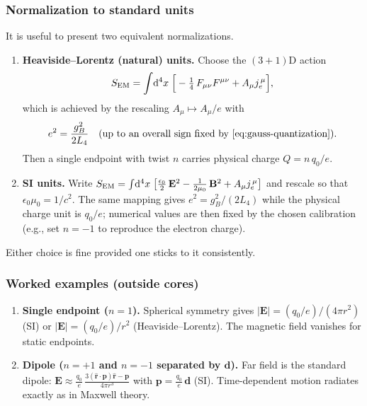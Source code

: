 \subsubsection{Normalization to standard units}
It is useful to present two equivalent normalizations.
\begin{enumerate}
  \item \textbf{Heaviside--Lorentz (natural) units.} Choose the $(3{+}1)$D action
  \begin{equation}
  S_{\rm EM}=\int\!\mathrm d^4x\;\Big[-\tfrac{1}{4}\,F_{\mu\nu}F^{\mu\nu}+A_\mu j_e^{\,\mu}\Big],
  \end{equation}
  which is achieved by the rescaling $A_\mu\mapsto A_\mu/e$ with
  \begin{equation}
  e^{2}=\frac{g_B^{2}}{2L_4} \quad (\text{up to an overall sign fixed by \eqref{eq:gauss-quantization}}).
  \end{equation}
  Then a single endpoint with twist $n$ carries physical charge $Q= n\,q_0/e$.

  \item \textbf{SI units.} Write $S_{\rm EM}=\int\!\mathrm d^4x\;\big[\tfrac{\epsilon_0}{2}\,\mathbf E^2-\tfrac{1}{2\mu_0}\,\mathbf B^2 + A_\mu j_e^{\,\mu}\big]$ and rescale so that $\epsilon_0\mu_0=1/c^2$. The same mapping gives $e^2= g_B^{2}/(2L_4)$ while the physical charge unit is $q_0/e$; numerical values are then fixed by the chosen calibration (e.g., set $n=-1$ to reproduce the electron charge).
\end{enumerate}
Either choice is fine provided one sticks to it consistently.

\subsubsection{Worked examples (outside cores)}
\begin{enumerate}
  \item \textbf{Single endpoint ($n=1$).} Spherical symmetry gives $|\mathbf E|= (q_0/e)/(4\pi r^2)$ (SI) or $|\mathbf E|=(q_0/e)/r^2$ (Heaviside--Lorentz). The magnetic field vanishes for static endpoints.
  \item \textbf{Dipole ($n=+1$ and $n=-1$ separated by $\mathbf d$).} Far field is the standard dipole: $\mathbf E\approx \tfrac{q_0}{e}\,\tfrac{3(\hat{\mathbf r}\!\cdot\!\mathbf p)\hat{\mathbf r}-\mathbf p}{4\pi r^3}$ with $\mathbf p=\tfrac{q_0}{e}\,\mathbf d$ (SI). Time-dependent motion radiates exactly as in Maxwell theory.
\end{enumerate}

